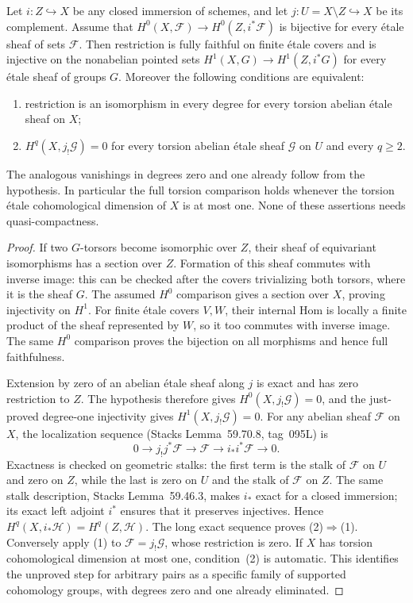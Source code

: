 \begin{proposition}\label{B:H1-gate}
Let $i:Z\hookrightarrow X$ be any closed immersion of schemes, and let $j:U=X\setminus Z\hookrightarrow X$ be its complement. Assume that $H^0(X,\mathcal F)\to H^0(Z,i^*\mathcal F)$ is bijective for every \'etale sheaf of sets $\mathcal F$. Then restriction is fully faithful on finite \'etale covers and is injective on the nonabelian pointed sets $H^1(X,G)\to H^1(Z,i^*G)$ for every \'etale sheaf of groups $G$. Moreover the following conditions are equivalent:
\begin{enumerate}
\item restriction is an isomorphism in every degree for every torsion abelian \'etale sheaf on $X$;
\item $H^q(X,j_!\mathcal G)=0$ for every torsion abelian \'etale sheaf $\mathcal G$ on $U$ and every $q\ge2$.
\end{enumerate}
The analogous vanishings in degrees zero and one already follow from the hypothesis. In particular the full torsion comparison holds whenever the torsion \'etale cohomological dimension of $X$ is at most one. None of these assertions needs quasi-compactness.
\end{proposition}
\begin{proof}
If two $G$-torsors become isomorphic over $Z$, their sheaf of equivariant isomorphisms has a section over $Z$. Formation of this sheaf commutes with inverse image: this can be checked after the covers trivializing both torsors, where it is the sheaf $G$. The assumed $H^0$ comparison gives a section over $X$, proving injectivity on $H^1$. For finite \'etale covers $V,W$, their internal Hom is locally a finite product of the sheaf represented by $W$, so it too commutes with inverse image. The same $H^0$ comparison proves the bijection on all morphisms and hence full faithfulness.

Extension by zero of an abelian \'etale sheaf along $j$ is exact and has zero restriction to $Z$. The hypothesis therefore gives $H^0(X,j_!\mathcal G)=0$, and the just-proved degree-one injectivity gives $H^1(X,j_!\mathcal G)=0$. For any abelian sheaf $\mathcal F$ on $X$, the localization sequence (Stacks Lemma~59.70.8, tag~095L) is
\[
 0\longrightarrow j_!j^*\mathcal F\longrightarrow\mathcal F
 \longrightarrow i_*i^*\mathcal F\longrightarrow0.
\]
Exactness is checked on geometric stalks: the first term is the stalk of $\mathcal F$ on $U$ and zero on $Z$, while the last is zero on $U$ and the stalk of $\mathcal F$ on $Z$. The same stalk description, Stacks Lemma~59.46.3, makes $i_*$ exact for a closed immersion; its exact left adjoint $i^*$ ensures that it preserves injectives. Hence $H^q(X,i_*\mathcal H)=H^q(Z,\mathcal H)$. The long exact sequence proves (2)$\Rightarrow$(1). Conversely apply (1) to $\mathcal F=j_!\mathcal G$, whose restriction is zero. If $X$ has torsion cohomological dimension at most one, condition~(2) is automatic. This identifies the unproved step for arbitrary pairs as a specific family of supported cohomology groups, with degrees zero and one already eliminated.
\end{proof}

